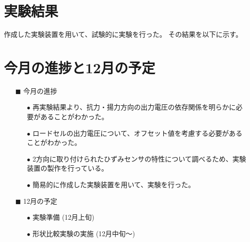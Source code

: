 \documentclass[twocolumn,a4j]{jsarticle}
\begin{document}
\newpage

\section{実験結果}
作成した実験装置を用いて、試験的に実験を行った。
その結果を以下に示す。

\newpage

\section{今月の進捗と12月の予定}
\begin{itemize}
    \item [$\blacksquare$] 今月の進捗
    \begin{itemize}
        \item [$\bullet$] 再実験結果より、抗力・揚力方向の出力電圧の依存関係を明らかに必要があることがわかった。
        \item [$\bullet$] ロードセルの出力電圧について、オフセット値を考慮する必要があることがわかった。
        \item [$\bullet$] 2方向に取り付けられたひずみセンサの特性について調べるため、実験装置の製作を行っている。
        \item [$\bullet$] 簡易的に作成した実験装置を用いて、実験を行った。
    \end{itemize}
    \item [$\blacksquare$] 12月の予定
    \begin{itemize}
        \item [$\bullet$] 実験準備 (12月上旬)
        \item [$\bullet$] 形状比較実験の実施 (12月中旬～)
    \end{itemize}
\end{itemize}
\end{document}
